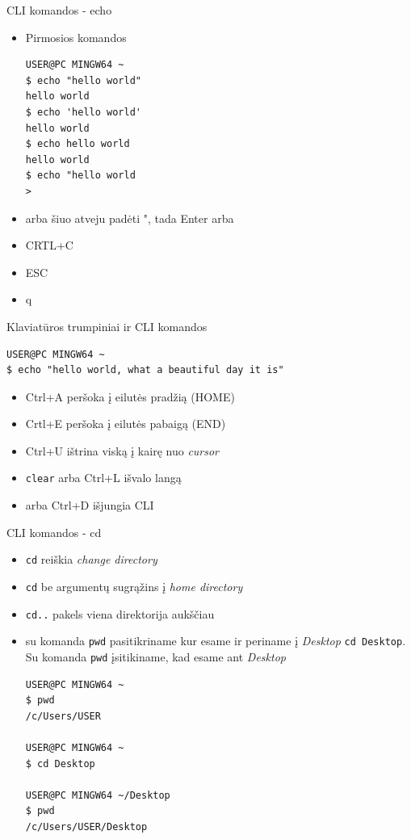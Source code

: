 \documentclass[11pt,xcolor=table]{beamer}
\begin{document}
\begin{frame}[fragile]{CLI komandos - echo}
\begin{itemize}
\item Pirmosios komandos
\begin{lstlisting}
USER@PC MINGW64 ~
$ echo "hello world"
hello world
$ echo 'hello world'
hello world
$ echo hello world
hello world
$ echo "hello world
>
\end{lstlisting}
\item arba šiuo atveju padėti ", tada Enter arba
\item CRTL+C
\item ESC
\item q
\end{itemize}
\end{frame}
\begin{frame}[fragile]{Klaviatūros trumpiniai ir CLI komandos}

\begin{lstlisting}
USER@PC MINGW64 ~
$ echo "hello world, what a beautiful day it is"
\end{lstlisting}

\begin{itemize}
\item Ctrl+A peršoka į eilutės pradžią (HOME)
\item Crtl+E peršoka į eilutės pabaigą (END)
\item Ctrl+U ištrina viską į kairę nuo \textit{cursor} 
\item \colorbox{listinggray}{\lstinline|clear|} arba Ctrl+L išvalo langą
\item  arba Ctrl+D išjungia CLI

\end{itemize}
\end{frame}

\begin{frame}[fragile]{CLI komandos - cd}
\begin{itemize}
\item \colorbox{listinggray}{\lstinline|cd|}  reiškia \textit{change directory}
\item \colorbox{listinggray}{\lstinline|cd|}  be argumentų sugrąžins į \textit{home directory}
\item \colorbox{listinggray}{\lstinline|cd..|} pakels viena direktorija aukščiau
\item su komanda \colorbox{listinggray}{\lstinline|pwd|} pasitikriname kur esame ir periname į \textit{Desktop}
\colorbox{listinggray}{\lstinline|cd Desktop|}. Su komanda \colorbox{listinggray}{\lstinline|pwd|}  įsitikiname, kad esame ant \textit{Desktop}
\begin{lstlisting}
USER@PC MINGW64 ~
$ pwd
/c/Users/USER

USER@PC MINGW64 ~
$ cd Desktop

USER@PC MINGW64 ~/Desktop
$ pwd
/c/Users/USER/Desktop

\end{lstlisting}
\end{itemize}
\end{frame}
\end{document}
